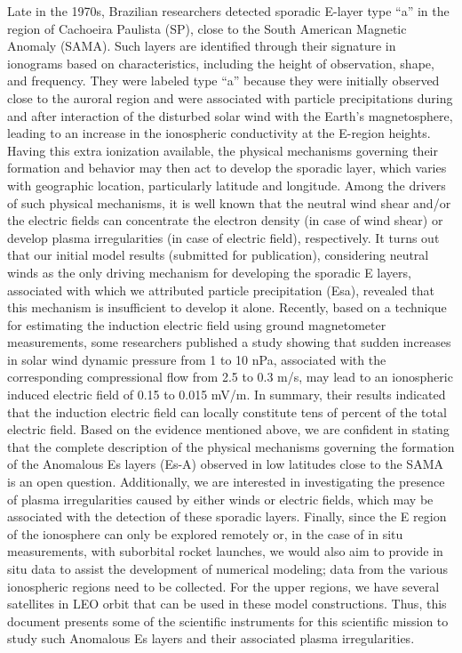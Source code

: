 \documentclass[11pt,a4paper]{article}
\newenvironment{EntryAbstract}[1][\normalsize]
  {\begingroup #1 \setlength{\parskip}{0.55em}\sloppy\noindent\ignorespaces}
  {\par\endgroup}
\begin{document}
\begin{EntryAbstract}[\footnotesize]
Late in the 1970s, Brazilian researchers detected sporadic E-layer type “a” in the region of Cachoeira Paulista (SP), close to the South American Magnetic Anomaly (SAMA). Such layers are identified through their signature in ionograms based on characteristics, including the height of observation, shape, and frequency. They were labeled type “a” because they were initially observed close to the auroral region and were associated with particle precipitations during and after interaction of the disturbed solar wind with the Earth’s magnetosphere, leading to an increase in the ionospheric conductivity at the E-region heights. Having this extra ionization available, the physical mechanisms governing their formation and behavior may then act to develop the sporadic layer, which varies with geographic location, particularly latitude and longitude. Among the drivers of such physical mechanisms, it is well known that the neutral wind shear and/or the electric fields can concentrate the electron density (in case of wind shear) or develop plasma irregularities (in case of electric field), respectively. It turns out that our initial model results (submitted for publication), considering neutral winds as the only driving mechanism for developing the sporadic E layers, associated with which we attributed particle precipitation (Esa), revealed that this mechanism is insufficient to develop it alone. Recently, based on a technique for estimating the induction electric field using ground magnetometer measurements, some researchers published a study showing that sudden increases in solar wind dynamic pressure from 1 to 10 nPa, associated with the corresponding compressional flow from 2.5 to 0.3 m/s, may lead to an ionospheric induced electric field of 0.15 to 0.015 mV/m. In summary, their results indicated that the induction electric field can locally constitute tens of percent of the total electric field. Based on the evidence mentioned above, we are confident in stating that the complete description of the physical mechanisms governing the formation of the Anomalous Es layers (Es-A) observed in low latitudes close to the SAMA is an open question. Additionally, we are interested in investigating the presence of plasma irregularities caused by either winds or electric fields, which may be associated with the detection of these sporadic layers. Finally, since the E region of the ionosphere can only be explored remotely or, in the case of in situ measurements, with suborbital rocket launches, we would also aim to provide in situ data to assist the development of numerical modeling; data from the various ionospheric regions need to be collected. For the upper regions, we have several satellites in LEO orbit that can be used in these model constructions. Thus, this document presents some of the scientific instruments for this scientific mission to study such Anomalous Es layers and their associated plasma irregularities.
\end{EntryAbstract}
\end{document}
